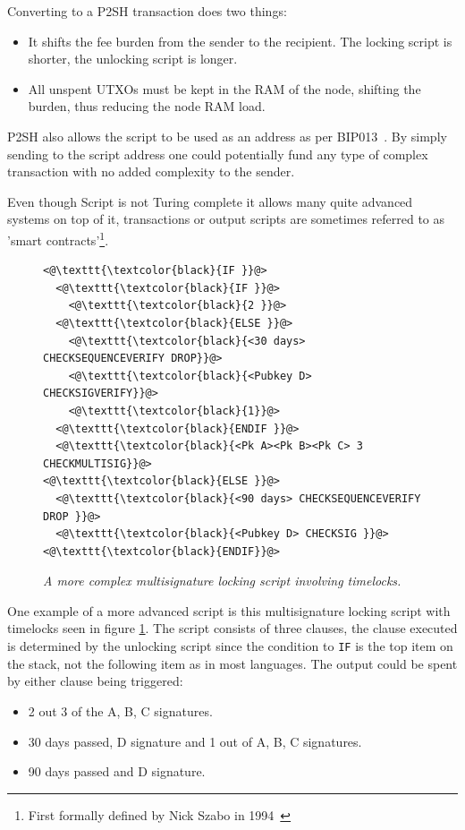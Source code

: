 Converting to a P2SH transaction does two things:

\begin{itemize}

	\item It shifts the fee burden from the sender to the recipient. The locking script is shorter, the unlocking script is longer.
	
	\item All unspent UTXOs must be kept in the RAM of the \gls{node}, shifting the burden, thus reducing the \gls{node} RAM load.
	
\end{itemize}

P2SH also allows the script to be used as an address as per BIP013~\cite{bip:0013:p2shaddr}. By simply sending to the script address one could potentially fund any type of complex transaction with no added complexity to the sender.

Even though Script is not Turing complete it allows many quite advanced systems on top of it, transactions or output scripts are sometimes referred to as 'smart contracts'\footnote{First formally defined by Nick Szabo in 1994~\cite{szabo:smart:contracts}}.

\begin{figure}[hbt!]
	
	\begin{lstlisting}	
<@\texttt{\textcolor{black}{IF }}@>
  <@\texttt{\textcolor{black}{IF }}@>
    <@\texttt{\textcolor{black}{2 }}@>
  <@\texttt{\textcolor{black}{ELSE }}@>
    <@\texttt{\textcolor{black}{<30 days> CHECKSEQUENCEVERIFY DROP}}@>
    <@\texttt{\textcolor{black}{<Pubkey D> CHECKSIGVERIFY}}@>
    <@\texttt{\textcolor{black}{1}}@>
  <@\texttt{\textcolor{black}{ENDIF }}@>
  <@\texttt{\textcolor{black}{<Pk A><Pk B><Pk C> 3 CHECKMULTISIG}}@>
<@\texttt{\textcolor{black}{ELSE }}@>
  <@\texttt{\textcolor{black}{<90 days> CHECKSEQUENCEVERIFY DROP }}@>
  <@\texttt{\textcolor{black}{<Pubkey D> CHECKSIG }}@>
<@\texttt{\textcolor{black}{ENDIF}}@>

	\end{lstlisting}
	
	\caption{\textit{ A more complex multisignature locking script involving timelocks.
	}}
	\label{fig:aantop:multi}
\end{figure}

One example of a more advanced script is this multisignature locking script with timelocks seen in figure \ref{fig:aantop:multi}. The script consists of three clauses, the clause executed is determined by the unlocking script since the condition to \texttt{IF} is the top item on the stack, not the following item as in most languages. The output could be spent by either clause being triggered:
\begin{itemize}
	\item 2 out 3 of the A, B, C signatures.
	\item 30 days passed, D signature and 1 out of A, B, C signatures.
	\item 90 days passed and D signature.
\end{itemize}

